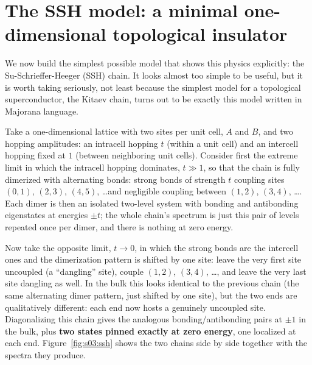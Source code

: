 \section{The SSH model: a minimal one-dimensional topological insulator}

We now build the simplest possible model that shows this physics explicitly: the Su-Schrieffer-Heeger
(SSH) chain. It looks almost too simple to be useful, but it is worth taking seriously, not least
because the simplest model for a topological superconductor, the Kitaev chain, turns out to be
exactly this model written in Majorana language.

Take a one-dimensional lattice with two sites per unit cell, $A$ and $B$, and two hopping amplitudes:
an intracell hopping $t$ (within a unit cell) and an intercell hopping fixed at $1$ (between
neighboring unit cells). Consider first the extreme limit in which the intracell hopping dominates,
$t \gg 1$, so that the chain is fully dimerized with alternating bonds: strong bonds of strength $t$
coupling sites $(0,1)$, $(2,3)$, $(4,5)$, \ldots and negligible coupling between $(1,2)$, $(3,4)$,
\ldots. Each dimer is then an isolated two-level system with
bonding and antibonding eigenstates at energies $\pm t$; the whole chain's spectrum is just this pair
of levels repeated once per dimer, and there is nothing at zero energy.

Now take the opposite limit, $t \to 0$, in which the strong bonds are the intercell ones and the
dimerization pattern is shifted by one site: leave the very first site uncoupled (a ``dangling''
site), couple $(1,2)$, $(3,4)$, \ldots, and leave the very last site dangling as well. In the bulk this
looks identical to the previous chain (the same alternating dimer pattern, just shifted by one site),
but the two ends are qualitatively different: each end now hosts a genuinely uncoupled site.
Diagonalizing this chain gives the analogous bonding/antibonding pairs at $\pm 1$ in the bulk, plus
\textbf{two states pinned exactly at zero energy}, one localized at each end. Figure~\ref{fig:s03:ssh}
shows the two chains side by side together with the spectra they produce.



